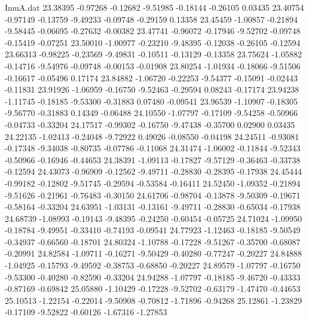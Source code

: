 \begin{filecontents}{ImuA.dat}
  23.38395   -0.97268   -0.12682   -9.51985   -0.18144   -0.26105    0.03435
  23.40754   -0.97149   -0.13759   -9.49233   -0.09748   -0.29159    0.13358
  23.45459   -1.00857   -0.21894   -9.58445   -0.06695   -0.27632   -0.00382
  23.47741   -0.96072   -0.17946   -9.52702   -0.09748   -0.15419   -0.07251
  23.50010   -1.00977   -0.23210   -9.48395   -0.12038   -0.26105   -0.12594
  23.66313   -0.98225   -0.23569   -9.49831   -0.10511   -0.13129   -0.13358
  23.75624   -1.05882   -0.14716   -9.54976   -0.09748   -0.00153   -0.01908
  23.80254   -1.01934   -0.18066   -9.51506   -0.16617   -0.05496    0.17174
  23.84882   -1.06720   -0.22253   -9.54377   -0.15091   -0.02443   -0.11831
  23.91926   -1.06959   -0.16750   -9.52463   -0.29594    0.08243   -0.17174
  23.94238   -1.11745   -0.18185   -9.53300   -0.31883    0.07480   -0.09541
  23.96539   -1.10907   -0.18305   -9.56770   -0.31883    0.14349   -0.06488
  24.10550   -1.07797   -0.17109   -9.54258   -0.50966   -0.04733   -0.33204
  24.17517   -0.99302   -0.16750   -9.47438   -0.35700    0.02900    0.03435
  24.22135   -1.02413   -0.24048   -9.72922    0.49026   -0.08550   -0.04198
  24.24511   -0.93081   -0.17348   -9.34038   -0.80735   -0.07786   -0.11068
  24.31474   -1.06002   -0.11844   -9.52343   -0.50966   -0.16946   -0.44653
  24.38391   -1.09113   -0.17827   -9.57129   -0.36463   -0.33738   -0.12594
  24.43073   -0.96909   -0.12562   -9.49711   -0.28830   -0.28395   -0.17938
  24.45444   -0.99182   -0.12802   -9.51745   -0.29594   -0.53584   -0.16411
  24.52450   -1.09352   -0.21894   -9.51626   -0.21961   -0.76483   -0.30150
  24.61706   -0.98704   -0.13878   -9.50309   -0.19671   -0.58164   -0.33204
  24.63951   -1.03131   -0.13161   -9.49711   -0.28830   -0.65034   -0.17938
  24.68739   -1.08993   -0.19143   -9.48395   -0.24250   -0.60454   -0.05725
  24.71024   -1.09950   -0.18784   -9.49951   -0.33410   -0.74193   -0.09541
  24.77923   -1.12463   -0.18185   -9.50549   -0.34937   -0.66560   -0.18701
  24.80324   -1.10788   -0.17228   -9.51267   -0.35700   -0.68087   -0.20991
  24.82584   -1.09711   -0.16271   -9.50429   -0.40280   -0.77247   -0.20227
  24.84888   -1.04925   -0.15793   -9.49592   -0.38753   -0.68850   -0.20227
  24.89579   -1.07797   -0.16750   -9.53300   -0.40280   -0.82590   -0.33204
  24.94288   -1.07797   -0.18185   -9.46720   -0.43333   -0.87169   -0.69842
  25.05880   -1.10429   -0.17228   -9.52702   -0.63179   -1.47470   -0.44653
  25.10513   -1.22154   -0.22014   -9.50908   -0.70812   -1.71896   -0.94268
  25.12861   -1.23829   -0.17109   -9.52822   -0.60126   -1.67316   -1.27853

\end{filecontents}
